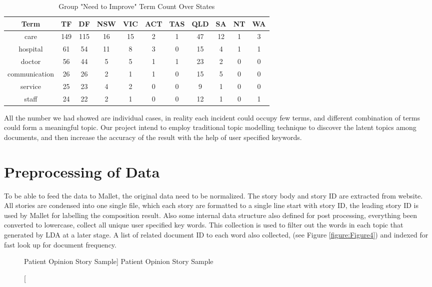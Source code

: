 \documentclass[11pt,twoside]{report}
\begin{document}
\begin{table}[h]
\caption{Group "Need to Improve" Term Count Over States}
\centering
\begin{tabular}{| c | c | c | c | c | c | c | c |c | c | c |}
\hline\hline
Term & TF & DF & NSW & VIC & ACT & TAS & QLD & SA & NT & WA \\
\hline
care & 149 & 115 & 16 & 15 & 2 & 1 & 47 & 12 & 1 & 3 \\
\hline
hospital & 61 & 54 & 11 & 8 & 3 & 0 & 15 & 4 & 1 & 1 \\
\hline
doctor & 56 & 44 & 5 & 5 & 1 & 1 & 23 & 2 & 0 & 0 \\
\hline
communication & 26 & 26 & 2 & 1 & 1 & 0 & 15 & 5 & 0 & 0 \\
\hline
service & 25 & 23 & 4 & 2 & 0 & 0 & 9 & 1 & 0 & 0 \\
\hline
staff & 24 & 22 & 2 & 1 & 0 & 0 & 12 & 1 & 0 & 1 \\
\hline
\end{tabular}
\label{table:ImproveCount}
\end{table}
All the number we had showed are individual cases, in reality each incident could occupy few terms, and different combination of terms could form a meaningful topic. Our project intend to employ traditional topic modelling technique to discover the latent topics among documents, and then increase the accuracy of the result with the help of user specified keywords.



\section{Preprocessing of Data}

To be able to feed the data to Mallet, the original data need to be normalized. The story body and story ID are extracted from website. All stories are condensed into one single file, which each story are formatted to a single line start with story ID, the leading story ID is used by Mallet for labelling the composition result. Also some internal data structure also defined for post processing, everything been converted to lowercase, collect all unique user specified key words. This collection is used to filter out the words in each topic that generated by LDA at a later stage. A list of related document ID to each word also collected, (see Figure \ref{figure:Figure4}) and indexed for fast look up for document frequency.

\begin{figure}[tp]
    \begin{center}
    \caption
    [Patient Opinion Story Sample]
    {
    Patient Opinion Story Sample
    \label{Figure4}
    }
    \end{center}
\end{figure}
\end{document}
